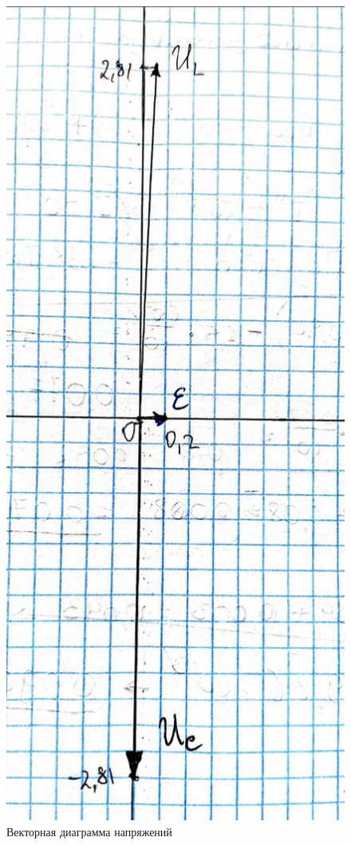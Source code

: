 \documentclass[a4paper, 12pt]{article}
\begin{document}
	\begin{figure}
		\includegraphics[height = 0.5\textheight]{Vector_diagram}
		\caption{Векторная диаграмма напряжений}
	\end{figure}
	
\end{document}
